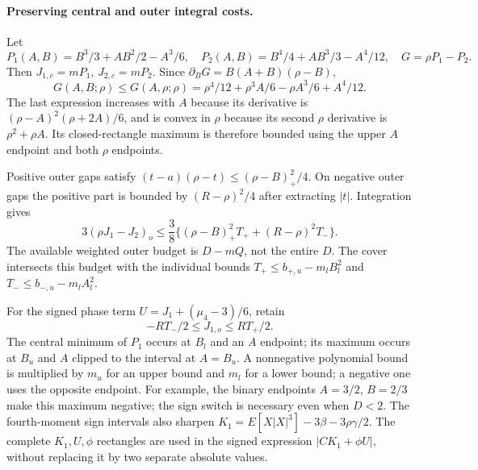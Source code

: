 \paragraph{Preserving central and outer integral costs.}
Let
\[
 P_1(A,B)=B^3/3+AB^2/2-A^3/6,\quad
 P_2(A,B)=B^4/4+AB^3/3-A^4/12,\quad G=\rho P_1-P_2.
\]
Then $J_{1,c}=mP_1$, $J_{2,c}=mP_2$. Since
$\partial_BG=B(A+B)(\rho-B)$,
\[
 G(A,B;\rho)\le G(A,\rho;\rho)
 =\rho^4/12+\rho^3A/6-\rho A^3/6+A^4/12.
\]
The last expression increases with $A$ because its derivative is
$(\rho-A)^2(\rho+2A)/6$, and is convex in $\rho$ because its second
$\rho$ derivative is $\rho^2+\rho A$. Its closed-rectangle maximum is
therefore bounded using the upper $A$ endpoint and both $\rho$ endpoints.

Positive outer gaps satisfy
$(t-a)(\rho-t)\le(\rho-B)_+^2/4$. On negative outer gaps the positive
part is bounded by $(R-\rho)^2/4$ after extracting $|t|$.
Integration gives
\[
 3(\rho J_1-J_2)_o
 \le\frac38\{(\rho-B)_+^2T_++(R-\rho)^2T_-\}.
\]
The available weighted outer budget is $D-mQ$, not the entire $D$.
The cover intersects this budget with the individual bounds
$T_+\le b_{+,u}-m_lB_l^2$ and $T_-\le b_{-,u}-m_lA_l^2$.

For the signed phase term $U=J_1+(\mu_4-3)/6$, retain
\[
 -RT_-/2\le J_{1,o}\le RT_+/2.
\]
The central minimum of $P_1$ occurs at $B_l$ and an $A$ endpoint;
its maximum occurs at $B_u$ and $A$ clipped to the interval at $A=B_u$.
A nonnegative polynomial bound is multiplied by $m_u$ for an upper
bound and $m_l$ for a lower bound; a negative one uses the opposite
endpoint. For example, the binary endpoints $A=3/2$, $B=2/3$ make this
maximum negative; the sign switch is necessary even when $D<2$.
The fourth-moment sign intervals also sharpen
$K_1=E[X|X|^3]-3\beta-3\rho\gamma/2$.
The complete $K_1,U,\phi$ rectangles are used in the signed expression
$|CK_1+\phi U|$, without replacing it by two separate absolute values.


